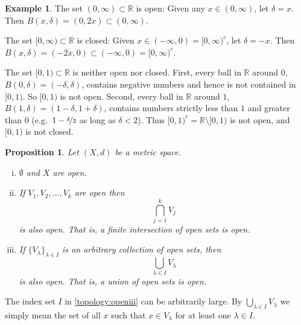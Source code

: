 \documentclass[12pt,openany]{book}
\newcommand{\R}{{\mathbb{R}}}
\theoremstyle{plain}
\newtheorem{prop}[thm]{Proposition}
\theoremstyle{remark}
\theoremstyle{definition}
\theoremstyle{exercise}
\theoremstyle{example}
\newtheorem{example}[thm]{Example}
\begin{document}
\begin{example}
The set $(0,\infty) \subset \R$ is open:  Given any $x \in (0,\infty)$,
let $\delta = x$.  Then $B(x,\delta) = (0,2x) \subset (0,\infty)$.

The set $[0,\infty) \subset \R$ is closed:  Given $x \in (-\infty,0) =
{[0,\infty)}^c$,
let $\delta = -x$.  Then $B(x,\delta) = (-2x,0) \subset
(-\infty,0) = {[0,\infty)}^c$.

The set $[0,1) \subset \R$ is neither open nor closed.  First,
every ball in $\R$ around $0$, $B(0,\delta) = (-\delta,\delta)$, contains negative
numbers and hence is not contained in $[0,1)$.  So $[0,1)$ is not open.
Second, every ball in $\R$ around $1$,
$B(1,\delta) = (1-\delta,1+\delta)$, contains
numbers strictly less than $1$ and greater than $0$
(e.g.\ $1-\nicefrac{\delta}{2}$ as long as $\delta < 2$).
Thus ${[0,1)}^c = \R \setminus
[0,1)$ is not open, and $[0,1)$ is not closed.
\end{example}

\begin{prop} \label{prop:topology:open}
Let $(X,d)$ be a metric space.
\begin{enumerate}[(i)]
\item \label{topology:openi} $\emptyset$ and $X$ are open.
\item \label{topology:openii} If $V_1, V_2, \ldots, V_k$ are open then
\begin{equation*}
\bigcap_{j=1}^k V_j
\end{equation*}
is also open.  That is, a finite intersection of open sets is open.
\item \label{topology:openiii} If $\{ V_\lambda \}_{\lambda \in I}$ is
an arbitrary collection of open sets, then
\begin{equation*}
\bigcup_{\lambda \in I} V_\lambda
\end{equation*}
is also open.  That is, a union of open sets is open.
\end{enumerate}
\end{prop}

The index set $I$ in \ref{topology:openiii} can be arbitrarily large.
By $\bigcup_{\lambda \in I} V_\lambda$ we simply mean the set of
all $x$ such that $x \in V_\lambda$ for at least one $\lambda \in I$.
\end{document}
